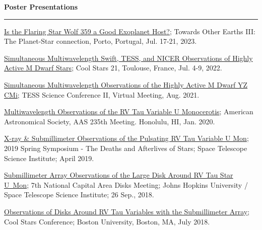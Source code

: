 \documentclass[letter,11pt]{article}
\begin{document}

\noindent
{\bf Poster Presentations} \\
\vspace{-10mm}
\begin{center}
\rule{\textwidth}{0.2mm}
\end{center}
\vspace{-3mm}
\noindent
\begin{etaremune}
\renewcommand\labelenumi{\bfseries\theenumi .}

\item \href{http://www.astro.up.pt/~sousasag/toe2023/Abstract_book_Posters.pdf}{Is the Flaring Star Wolf 359 a Good Exoplanet Host?}; Towards Other Earths III: The Planet-Star connection, Porto, Portugal, Jul. 17-21, 2023.

\item \href{https://coolstars21.github.io/docs/CS21booklet.pdf}{Simultaneous Multiwavelength Swift, TESS, and NICER Observations of Highly Active M Dwarf Stars}; Cool Stars 21, Toulouse, France, Jul. 4-9, 2022.

\item \href{https://zenodo.org/record/5142127#.YmbZsJPMJCV}{Simultaneous Multiwavelength Observations of the Highly Active M Dwarf YZ CMi}; TESS Science Conference II, Virtual Meeting, Aug. 2021.

\item \href{https://ui.adsabs.harvard.edu/abs/2020AAS...23510607V/abstract}{Multiwavelength Observations of the RV Tau Variable U Monocerotis}; American Astronomical Society, AAS 235th Meeting.  Honolulu, HI, Jan.  2020.

\item \href{http://www.stsci.edu/~ofox/posters2019/}{X-ray \& Submillimeter Observations of the Pulsating RV Tau Variable U Mon}; 2019 Spring Symposium - The Deaths and Afterlives of Stars; Space Telescope Science Institute; April 2019.

\item \href{https://sites.google.com/view/ncad7-at-jhu/program?authuser=0}{Submillimeter Array Observations of the Large Disk Around RV Tau Star U~Mon}; 7th National Capital Area Disks Meeting; Johns Hopkins University / Space Telescope Science Institute; 26 Sep., 2018.

\item \href{http://coolstars20.cfa.harvard.edu/abstracts.html#posters}{Observations of Disks Around RV Tau Variables with the Submillimeter Array}; Cool Stars Conference; Boston University, Boston, MA, July 2018.


\end{etaremune}
\end{document}
